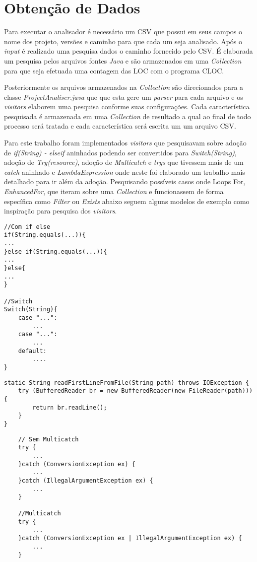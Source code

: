 \chapter{Obtenção de Dados}
Para executar o analisador é necessário um \acs{CSV} que possui em seus campos o nome dos projeto, versões e caminho para que cada um seja analisado. Após o {\it input} é realizado uma pesquisa dados o caminho fornecido pelo \acs{CSV}.
É elaborada um pesquisa pelos arquivos fontes \textit{Java} e são armazenados em uma \textit{Collection} para que seja efetuada uma contagem das \acs{LOC} com o programa \acs{CLOC}.

Posteriormente os arquivos armazenados na \textit{Collection} são direcionados para a classe \textit{ProjectAnaliser.java} que que esta gere um \textit{parser} para cada arquivo e os \textit{visitors} elaborem uma pesquisa conforme suas configurações. Cada característica pesquisada é armazenada em uma \textit{Collection} de resultado a qual ao final de todo processo será tratada e cada característica será escrita um um arquivo \acs{CSV}.

Para este trabalho foram implementados \textit{visitors} que pesquisavam sobre adoção de \textit{if(String) - elseif} aninhados podendo ser convertidos para \textit{Switch(String)},  adoção de \textit{Try(resource)},  adoção de \textit{Multicatch} e \textit{trys} que tivessem mais de um \textit{catch} aninhado e \textit{LambdaExpression} onde neste foi elaborado um trabalho mais detalhado para ir além da adoção. Pesquisando possíveis casos onde Loops For, \textit{EnhancedFor}, que iteram sobre uma \textit{Collection} e funcionassem de forma específica como \textit{Filter} ou \textit{Exists} abaixo seguem alguns modelos de exemplo como inspiração para pesquisa dos \textit{visitors}.

\begin{lstlisting}
//Com if else
if(String.equals(...)){
...
}else if(String.equals(...)){
...
}else{
...
}

//Switch
Switch(String){
	case "...":
		...
	case "...":
		...
	default:
		....
}
\end{lstlisting}

\begin{lstlisting}
static String readFirstLineFromFile(String path) throws IOException {
	try (BufferedReader br = new BufferedReader(new FileReader(path))) {
		return br.readLine();
	}
}
\end{lstlisting}


\begin{lstlisting}
	// Sem Multicatch
	try {
		...
	}catch (ConversionException ex) {
		...
	}catch (IllegalArgumentException ex) {
		...
	}
	
	//Multicatch
	try {
		...
	}catch (ConversionException ex | IllegalArgumentException ex) {
		...
	}
\end{lstlisting}

